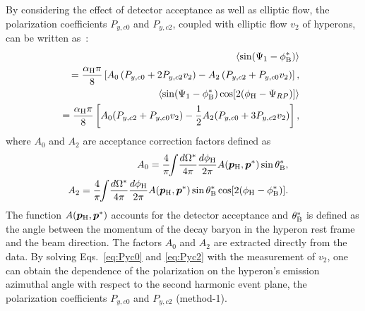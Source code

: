 \documentclass[preprint,5p,times,twocolumn]{elsarticle}
\begin{document}
By considering the effect of detector acceptance as well as elliptic flow, the polarization coefficients $P_{y,c0}$ and $P_{y,c2}$, coupled with elliptic flow $v_2$ of hyperons, can be written as~\cite{Niida:2024ntm}:
%
\begin{eqnarray}
& &\hspace{-35pt} \langle\sin(\Psi_1-\phi_{\rm B}^{\ast})\rangle \nonumber \\
& &\hspace{-15pt} = \dfrac{\alpha_{\rm H}\pi}{8}\left[A_{0}\left(P_{y,c0}+2P_{y,c2}v_{2}\right)-A_{2}\left(P_{y,c2}+P_{y,c0}v_{2}\right)\right], \label{eq:Pyc0} \\
& &\hspace{-35pt} \langle\sin(\Psi_1-\phi_{\rm B}^{\ast})\cos[2(\phi_{\rm H}-\Psi_{RP})]\rangle \nonumber \\
& &\hspace{-15pt} = \dfrac{\alpha_{\rm H}\pi}{8}\left[A_{0}(P_{y,c2}+P_{y,c0}v_{2})-\dfrac{1}{2}A_{2}(P_{y,c0}+3P_{y,c2}v_{2})\right],\label{eq:Pyc2}
\end{eqnarray}
where $A_{0}$ and $A_{2}$ are acceptance correction factors defined as
\begin{eqnarray}
&&\hspace{-20pt} A_{0} = \dfrac{4}{\pi} \!\!\int\! \dfrac{d\Omega^{\ast}}{4\pi} \dfrac{d\phi_{\rm H}}{2\pi} A(\boldsymbol{p}_{\rm H}, \boldsymbol{p}^{\ast})\sin\theta_{\rm B}^{\ast}, \label{eq:A0}\\
%
&&\hspace{-20pt} A_{2} = \dfrac{4}{\pi} \!\!\int\! \dfrac{d\Omega^{\ast}}{4\pi} \dfrac{d\phi_{\rm H}}{2\pi} A(\boldsymbol{p}_{\rm H},\boldsymbol{p}^{\ast})\sin\theta_{\rm B}^{\ast}\cos[2(\phi_{\rm H}-\phi_{\rm B}^{\ast})].
\end{eqnarray}
The function $A(\boldsymbol{p}_{\rm H}, \boldsymbol{p}^{\ast})$ accounts for the detector acceptance and $\theta_{\rm B}^{\ast}$ is defined as the angle between the momentum of the decay baryon in the hyperon rest frame and the beam direction.
The factors $A_{0}$ and $A_{2}$ are extracted directly from the data. By solving Eqs.~\eqref{eq:Pyc0} and \eqref{eq:Pyc2} with the measurement of $v_2$, one can obtain the dependence of the polarization on the hyperon’s emission azimuthal angle with respect to the second harmonic event plane, the polarization coefficients $P_{y,c0}$ and $P_{y,c2}$ (method-1). 
\end{document}
